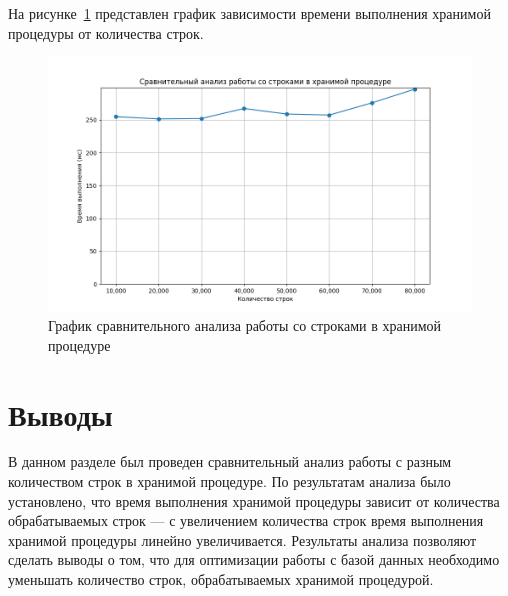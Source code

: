 На рисунке~\ref{fig:myplot} представлен график зависимости времени выполнения хранимой процедуры от количества строк.

\begin{figure}[H]
	\centering
	\includegraphics[scale=0.4]{inc/myplot}
	\caption{График сравнительного анализа работы со строками в хранимой процедуре}
	\label{fig:myplot}
\end{figure}

\section*{Выводы}
В данном разделе был проведен сравнительный анализ работы с разным количеством строк в хранимой процедуре.
По результатам анализа было установлено, что время выполнения хранимой процедуры зависит от количества обрабатываемых строк --- с увеличением количества строк время выполнения хранимой процедуры линейно увеличивается.
Результаты анализа позволяют сделать выводы о том, что для оптимизации работы с базой данных необходимо уменьшать количество строк, обрабатываемых хранимой процедурой.



